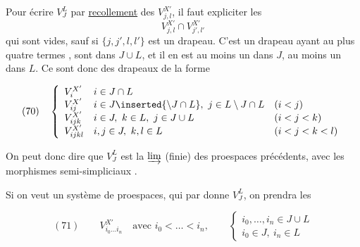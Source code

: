 
Pour écrire $V_J^L$ par \uline{recollement} des $V_{j,l}^{X'}$, il faut expliciter les
\[
V_{j,l}^{X'}\cap V_{j',l'}^{X'}
\]
qui sont vides, sauf si $\{j,j',l,l'\}$ est un drapeau. C'est un drapeau  ayant au plus quatre termes ,   sont dans $J\cup L$, et il en est au  moins un dans $J$, au moins un dans $L$. Ce sont donc des drapeaux de la forme


\[
(70)\quad\left\{\begin{array}{lll}
V_i^{X'}&i\in J\cap L&\\
V_{ij}^{X'}&i\in J\inserted{\setminus J\cap L},\ j\in L\setminus J\cap L&(i<j)\\
V_{ijk}^{X'}&i\in J,\ k\in L,\ j\in J\cup L&(i<j<k)\\
V_{ijkl}^{X'}&i,j\in J,\ k,l\in L&(i<j<k<l)
\end{array}\right.
\]


On peut donc dire que $V_J^L$ est la $\varinjlim$ (finie) des proespaces précédents, avec  les morphismes semi-simpliciaux  .

Si on veut un système  de proespaces,  qui par  \inserted{$\unsure{\varinjlim|\underline{\lim}}$} donne $V_J^L$, on prendra les

\[
(71)\qquad V_{i_0\ldots i_n}^{X'}\quad\text{avec }i_0<\ldots<i_n,\qquad
\left\{\begin{array}{l}
i_0,\ldots,i_n\in J\cup L\\
i_0\in J,\ i_n\in L
\end{array}\right.
\]

